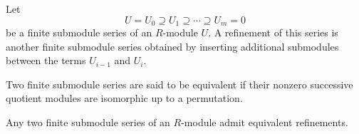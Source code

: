 \begin{definition}
    Let
    \[
        U=U_0\supseteq U_1\supseteq\cdots\supseteq U_m=0
    \]
    be a finite submodule series of an $R$-module $U$.
    A refinement of this series is another finite submodule series obtained by inserting
    additional submodules between the terms $U_{i-1}$ and $U_i$.

    Two finite submodule series are said to be equivalent if their nonzero successive
    quotient modules are isomorphic up to a permutation.
\end{definition}

\begin{theorem}
    Any two finite submodule series of an $R$-module admit equivalent refinements.
\end{theorem}

